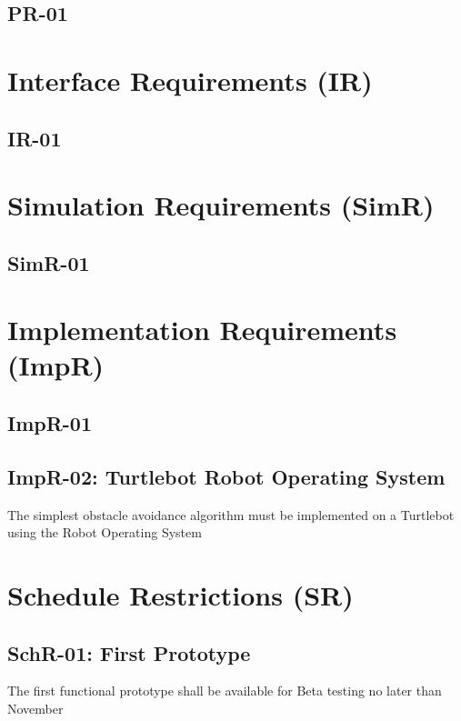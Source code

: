 \documentclass[]{report}
\begin{document}
\subsection{PR-01}

\section{Interface Requirements (IR)}

\subsection{IR-01}

\section{Simulation Requirements (SimR)}

\subsection{SimR-01}

\section{Implementation Requirements (ImpR)}

\subsection{ImpR-01}

\subsection{ImpR-02: Turtlebot Robot Operating System}

The simplest obstacle avoidance algorithm must be implemented on a Turtlebot using the Robot Operating System

\section{Schedule Restrictions (SR)}

\subsection{SchR-01: First Prototype}

The first functional prototype shall be available for Beta testing no later than November 
\end{document}
